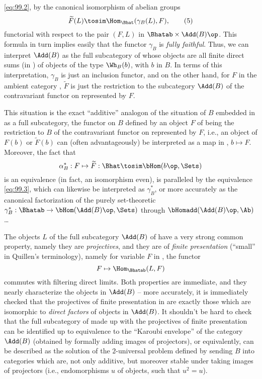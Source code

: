 \eqref{eq:99.2}, by the canonical isomorphism of abelian groups
\begin{equation}
  \label{eq:99.5}
  \widetilde F(L)\tosim \Hom_\Bhat(\gamma_B(L),F),\tag{5}
\end{equation}
functorial with respect to the pair $(F,L)$ in
$\Bhatab\times\Add(B)\op$. This formula in turn implies easily that
the functor $\gamma_B$ is \emph{fully faithful}. Thus, we can
interpret $\Add(B)$ as the full subcategory of \Bhatab{} whose objects
are all finite direct sums (in \Bhatab) of objects of the type
$\Wh_B(b)$, with $b$ in $B$. In terms of this interpretation,
$\gamma_B$ is just an inclusion functor, and on the other hand, for
$F$ in the ambient category \Bhatab, $\widetilde F$ is just the
restriction to the subcategory $\Add(B)$ of the contravariant functor
on \Bhatab{} represented by $F$.

This situation is the exact ``additive'' analogon of the situation of
$B$ embedded in \Bhat{} as a full subcategory, the functor on $B$
defined by an object $F$ of \Bhat{} being the restriction to $B$ of
the contravariant functor on \Bhat{} represented by $F$, i.e., an
object of $F(b)$ or $\widetilde F(b)$ can (often advantageously) be
interpreted as a map in \Bhat, $b\mapsto F$. Moreover, the fact that
\[\alpha_B^*: F\mapsto \widetilde F: \Bhat \tosim \bHom(b\op,\Sets)\]
is an equivalence (in fact, an isomorphism even), is paralleled by the
equivalence \eqref{eq:99.3}, which can likewise be interpreted as
$\gamma_B^*$, or more accurately as the canonical factorization of the
purely set-theoretic $\gamma_B^*:\Bhatab\to\bHom(\Add(B)\op,\Sets)$
through $\bHomadd(\Add(B)\op,\Ab)$\ldots

The objects $L$ of the full subcategory $\Add(B)$ of \Bhatab{} have a
very strong common property, namely they are \emph{projectives}, and
they are of \emph{finite presentation} (``small'' in Quillen's
terminology), namely for variable $F$ in \Bhatab, the functor
\[F\mapsto \Hom_\Bhatab(L,F)\]
commutes with filtering direct limits. Both properties are immediate,
and they nearly characterize the objects in $\Add(B)$ -- more
accurately, it is immediately checked that the projectives of finite
presentation in \Bhatab{} are exactly those which are isomorphic to
\emph{direct factors} of objects in $\Add(B)$. It shouldn't be hard to
check that the full subcategory of \Bhatab{} made up with the
projectives of finite presentation can be identified up to equivalence
to the ``Karoubi envelope'' of the category $\Add(B)$ (obtained by
formally adding images of projectors), or equivalently, can be
described as the solution of the $2$-universal problem defined by
sending $B$ into categories which are, not only additive, but moreover
stable under taking images of projectors (i.e., endomorphisms $u$ of
objects, such that $u^2=u$).

